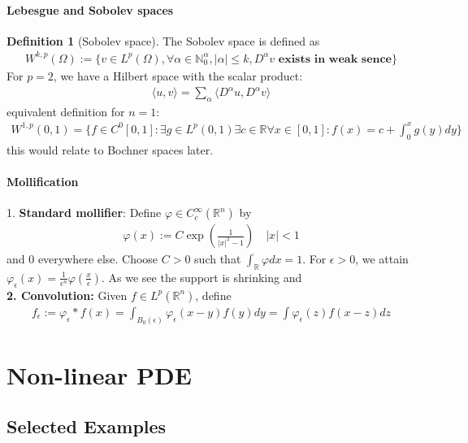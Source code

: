 \documentclass[a4paper,11pt,oneside,fleqn]{book}
\theoremstyle{definition}
\newtheorem{definition}{Definition}[section]
\theoremstyle{remark}
\begin{document}
\subsubsection*{Lebesgue and Sobolev spaces}
\begin{definition}[Sobolev space]
	The Sobolev space is defined as 
	\begin{align*}
		W^{k, p}(\Omega) := \{ v \in L^p(\Omega), \forall \alpha \in \mathbb{N}_0^\alpha, |\alpha| \le k, D^\alpha v \textbf{ exists in weak sence}\}
	\end{align*}
	For $p = 2$, we have a Hilbert space with the scalar product:
	\begin{align*}
		\langle u, v \rangle = \sum_{\alpha} \langle D^\alpha u, D^\alpha v \rangle
	\end{align*}
	equivalent definition for $n = 1$: 
	\begin{align*}
		W^{1, p}(0, 1) = \{ f \in C^0[0, 1]: \exists g \in L^p(0, 1) \exists c \in \mathbb{R} \forall x \in [0, 1]: f(x) = c + \int_0^x g(y)dy \}
	\end{align*}
	this would relate to Bochner spaces later. 
\end{definition}

\subsubsection*{Mollification}
1. \textbf{Standard mollifier}: Define $\varphi \in C_c^\infty(\mathbb{R}^n)$ by 
\begin{align*}
	\varphi(x) := C\exp(\frac{1}{|x|^2 - 1}) \quad |x| < 1
\end{align*}
and 0 everywhere else. Choose $C>0$ such that $\int_\mathbb{R} \varphi dx = 1$. For $\epsilon >0$, we attain $\varphi_\epsilon(x) = \frac{1}{\epsilon^n} \varphi (\frac{x}{\epsilon})$. As we see the support is shrinking and \\
\textbf{2. Convolution:} Given $f \in L^p(\mathbb{R}^n)$, define 
\begin{align*}
	f_\epsilon := \varphi_\epsilon * f(x) = \int_{B_0(\epsilon)} \varphi_\epsilon (x - y) f(y) dy = \int \varphi_\epsilon(z)f(x - z)dz
\end{align*} 




\chapter{Non-linear PDE}
\section{Selected Examples}
\end{document}
